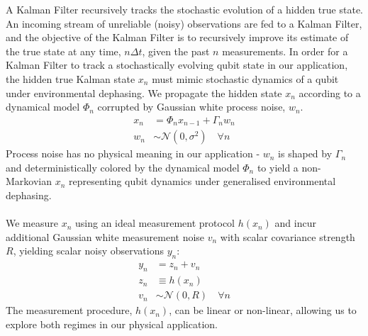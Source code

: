 A Kalman Filter recursively tracks the stochastic evolution of a hidden true state. An incoming stream of unreliable (noisy) observations are fed to a Kalman Filter, and the objective of the Kalman Filter is to recursively improve its estimate of the true state at any time, $n\Delta t$, given the past $n$ measurements. In order for a Kalman Filter to track a stochastically evolving qubit state in our application, the hidden true Kalman state $x_n$ must mimic stochastic dynamics  of a qubit under environmental dephasing. We propagate the hidden state $x_n$ according to a dynamical model $\Phi_n$ corrupted by Gaussian white process  noise, $w_n$.  
\begin{align}
x_n & = \Phi_n x_{n-1} + \Gamma_n w_n \label{eqn:KF:dynamics} \\
w_n & \sim \mathcal{N}(0, \sigma^2) \quad \forall n 
\end{align}
Process noise has no physical meaning in our application - $w_n$ is shaped by $\Gamma_n$ and deterministically colored by the dynamical model $\Phi_n$ to yield a non-Markovian $x_n$ representing qubit dynamics under generalised environmental dephasing. 
\\
\\
We measure $x_n$ using an ideal measurement protocol $h(x_n)$ and incur additional Gaussian white measurement noise $v_n$ with scalar covariance strength $R$, yielding scalar noisy observations $y_n$:
\begin{align}
y_n &= z_n + v_n \\
z_n & \equiv  h(x_n) \\
v_n & \sim \mathcal{N}(0, R) \quad \forall n
\end{align}
The measurement procedure, $h(x_n)$, can be linear or non-linear, allowing us to explore both regimes in our physical application.
\\
\\

